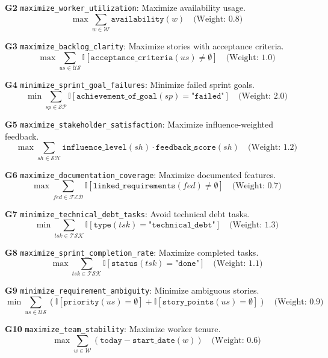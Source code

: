 \documentclass[12pt]{article}
\begin{document}
    \item[\textbf{G2}] \texttt{maximize\_worker\_utilization}: Maximize availability usage.
    \[
    \max \sum_{w \in \mathcal{W}} \texttt{availability}(w) \quad \text{(Weight: 0.8)}
    \]

    \item[\textbf{G3}] \texttt{maximize\_backlog\_clarity}: Maximize stories with acceptance criteria.
    \[
    \max \sum_{us \in \mathcal{US}} \mathbb{I}[\texttt{acceptance\_criteria}(us) \neq \emptyset] \quad \text{(Weight: 1.0)}
    \]

    \item[\textbf{G4}] \texttt{minimize\_sprint\_goal\_failures}: Minimize failed sprint goals.
    \[
    \min \sum_{sp \in \mathcal{SP}} \mathbb{I}[\texttt{achievement\_of\_goal}(sp) = \texttt{"failed"}] \quad \text{(Weight: 2.0)}
    \]

    \item[\textbf{G5}] \texttt{maximize\_stakeholder\_satisfaction}: Maximize influence-weighted feedback.
    \[
    \max \sum_{sh \in \mathcal{SH}} \texttt{influence\_level}(sh) \cdot \texttt{feedback\_score}(sh) \quad \text{(Weight: 1.2)}
    \]

    \item[\textbf{G6}] \texttt{maximize\_documentation\_coverage}: Maximize documented features.
    \[
    \max \sum_{fed \in \mathcal{FED}} \mathbb{I}[\texttt{linked\_requirements}(fed) \neq \emptyset] \quad \text{(Weight: 0.7)}
    \]

    \item[\textbf{G7}] \texttt{minimize\_technical\_debt\_tasks}: Avoid technical debt tasks.
    \[
    \min \sum_{tsk \in \mathcal{TSK}} \mathbb{I}[\texttt{type}(tsk) = \texttt{"technical\_debt"}] \quad \text{(Weight: 1.3)}
    \]

    \item[\textbf{G8}] \texttt{maximize\_sprint\_completion\_rate}: Maximize completed tasks.
    \[
    \max \sum_{tsk \in \mathcal{TSK}} \mathbb{I}[\texttt{status}(tsk) = \texttt{"done"}] \quad \text{(Weight: 1.1)}
    \]

    \item[\textbf{G9}] \texttt{minimize\_requirement\_ambiguity}: Minimize ambiguous stories.
    \[
    \min \sum_{us \in \mathcal{US}} \left( \mathbb{I}[\texttt{priority}(us) = \emptyset] + \mathbb{I}[\texttt{story\_points}(us) = \emptyset] \right) \quad \text{(Weight: 0.9)}
    \]

    \item[\textbf{G10}] \texttt{maximize\_team\_stability}: Maximize worker tenure.
    \[
    \max \sum_{w \in \mathcal{W}} (\texttt{today} - \texttt{start\_date}(w)) \quad \text{(Weight: 0.6)}
    \]
\end{document}
